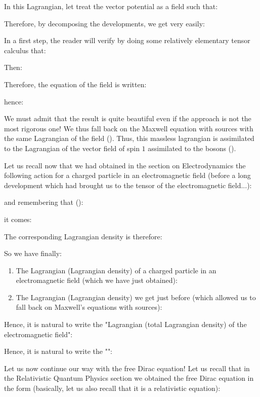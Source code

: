 	In this Lagrangian, let treat the vector potential as a field such that:
	
	Therefore, by decomposing the developments, we get very easily:
	
	In a first step, the reader will verify by doing some relatively elementary tensor calculus that:
	
	Then:
	
	Therefore, the equation of the field is written:
	
	hence:
	
	We must admit that the result is quite beautiful even if the approach is not the most rigorous one! We thus fall back on the Maxwell equation with sources with the same Lagrangian of the field (). Thus, this massless lagrangian is assimilated to the Lagrangian of the vector field of spin $1$ assimilated to the bosons ().

	Let us recall now that we had obtained in the section on Electrodynamics the following action for a charged particle in an electromagnetic field (before a long development which had brought us to the tensor of the electromagnetic field...):
	
	and remembering that ():
	
	it comes:
	
	The corresponding Lagrangian density is therefore:
	
	So we have finally:
	\begin{enumerate}
		\item The Lagrangian (Lagrangian density) of a charged particle in an electromagnetic field (which we have just obtained):
		
		\item The Lagrangian (Lagrangian density) we get just before (which allowed us to fall back on Maxwell's equations with sources):
		
	\end{enumerate}
	Hence, it is natural to write the "Lagrangian (total Lagrangian density) of the electromagnetic field":
	
	Hence, it is natural to write the "":
	
	Let us now continue our way with the free Dirac equation! Let us recall that in the Relativistic Quantum Physics section we obtained the free Dirac equation in the form (basically, let us also recall that it is a relativistic equation):
	

